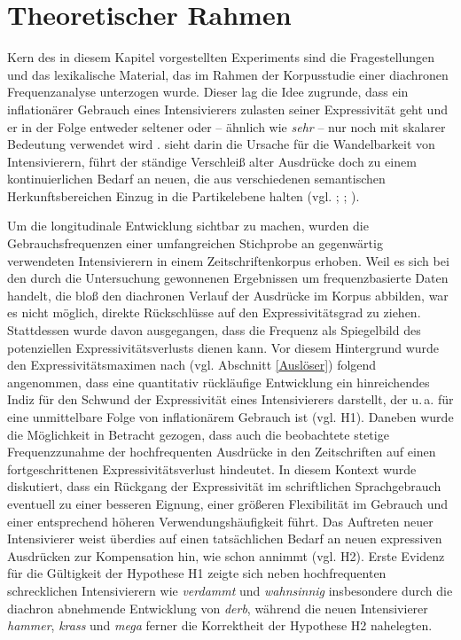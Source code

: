 \section{Theoretischer Rahmen}\label{abs:}
Kern des in diesem Kapitel vorgestellten Experiments sind die Fragestellungen und das lexikalische Material, das im Rahmen der Korpusstudie einer diachronen Frequenzanalyse unterzogen wurde. Dieser lag die Idee zugrunde, dass ein inflationärer Gebrauch eines Intensivierers zulasten seiner Expressivität geht und er in der Folge entweder seltener oder -- ähnlich wie \textit{sehr} -- nur noch mit skalarer Bedeutung verwendet wird {\citep[vgl.][2]{Hauschild.1899}}. {\citet[274]{Baumgarten.1908}} sieht darin die Ursache für die Wandelbarkeit von Intensivierern, führt der ständige Verschleiß alter Ausdrücke doch zu einem kontinuierlichen Bedarf an neuen, die aus verschiedenen semantischen Herkunftsbereichen Einzug in die Partikelebene halten (vgl. {\citealt[126f.]{Biedermann.1969}}; \citealt[18]{Bolinger.1972}; \citealt[]{Claudi.2006}).


Um die longitudinale Entwicklung sichtbar zu machen, wurden die Gebrauchsfrequenzen einer umfangreichen Stichprobe an gegenwärtig verwendeten Intensivierern in einem Zeitschriftenkorpus erhoben. Weil es sich bei den durch die Untersuchung gewonnenen Ergebnissen um frequenzbasierte Daten handelt, die bloß den diachronen Verlauf der Ausdrücke im Korpus abbilden, war es nicht möglich, direkte Rückschlüsse auf den Expressivitätsgrad zu ziehen. Stattdessen wurde davon ausgegangen, dass die Frequenz als Spiegelbild des potenziellen Expressivitätsverlusts dienen kann. Vor diesem Hintergrund wurde den Expressivitätsmaximen nach {\citet[]{Kirschbaum.2002b}} (vgl. {Abschnitt \ref{Auslöser}}) folgend angenommen, dass eine quantitativ rückläufige Entwicklung ein hinreichendes Indiz für den Schwund der Expressivität eines Intensivierers darstellt, der u.\,a. für \citet[2]{Hauschild.1899} eine unmittelbare Folge von inflationärem Gebrauch ist (vgl. H1). Daneben wurde die Möglichkeit in Betracht gezogen, dass auch die beobachtete stetige Frequenzzunahme der hochfrequenten Ausdrücke in den Zeitschriften auf einen fortgeschrittenen Expressivitätsverlust hindeutet. In diesem Kontext wurde diskutiert, dass ein Rückgang der Expressivität im schriftlichen Sprachgebrauch eventuell zu einer besseren Eignung, einer größeren Flexibilität im Gebrauch und einer entsprechend höheren Verwendungshäufigkeit führt. Das Auftreten neuer Intensivierer weist überdies auf einen tatsächlichen Bedarf an neuen expressiven Ausdrücken zur Kompensation hin, wie schon \citet[274]{Baumgarten.1908} annimmt {(vgl. H2)}. Erste Evidenz für die Gültigkeit der Hypothese H1 zeigte sich neben hochfrequenten \glqq{}schrecklichen\grqq{} Intensivierern wie \textit{verdammt} und \textit{wahnsinnig} insbesondere durch die diachron abnehmende Entwicklung von \textit{derb}, während die neuen Intensivierer \textit{hammer}, \textit{krass} und \textit{mega} ferner die Korrektheit der Hypothese H2 nahelegten.


